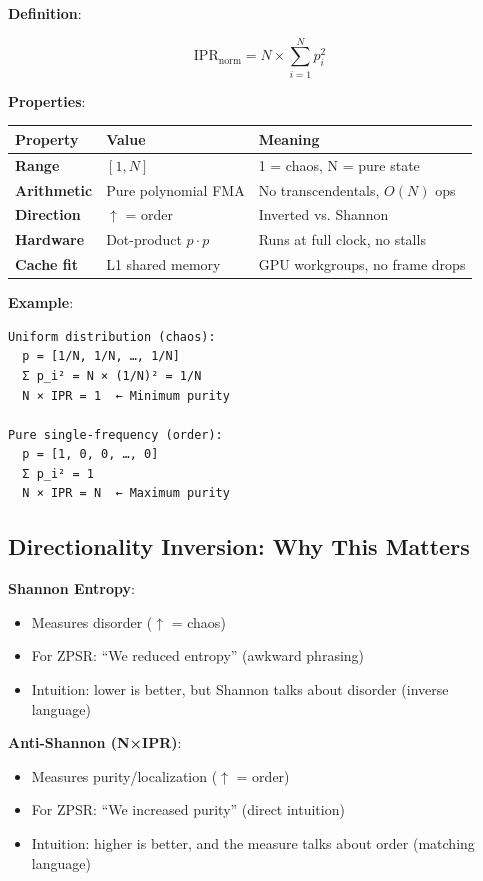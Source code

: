 \documentclass[11pt,oneside]{article}
\begin{document}
\textbf{Definition}:

\[\text{IPR}_{\text{norm}} = N \times \sum_{i=1}^{N} p_i^2\]

\textbf{Properties}:

\begin{center}
\begin{tabular}{lll}
\toprule
Property & Value & Meaning \\
\midrule
\textbf{Range} & $[1, N]$ & 1 = chaos, N = pure state \\
\textbf{Arithmetic} & Pure polynomial FMA & No transcendentals, $O(N)$ ops \\
\textbf{Direction} & $\uparrow$ = order & Inverted vs. Shannon \\
\textbf{Hardware} & Dot-product $p \cdot p$ & Runs at full clock, no stalls \\
\textbf{Cache fit} & L1 shared memory & GPU workgroups, no frame drops \\
\bottomrule
\end{tabular}
\end{center}

\textbf{Example}:

\begin{lstlisting}
Uniform distribution (chaos):
  p = [1/N, 1/N, …, 1/N]
  Σ p_i² = N × (1/N)² = 1/N
  N × IPR = 1  ← Minimum purity

Pure single-frequency (order):
  p = [1, 0, 0, …, 0]
  Σ p_i² = 1
  N × IPR = N  ← Maximum purity
\end{lstlisting}

\subsection{Directionality Inversion: Why This Matters}

\textbf{Shannon Entropy}:
\begin{itemize}
  \item Measures disorder ($\uparrow$ = chaos)
  \item For ZPSR: ``We reduced entropy'' (awkward phrasing)
  \item Intuition: lower is better, but Shannon talks about disorder (inverse language)
\end{itemize}

\textbf{Anti-Shannon (N×IPR)}:
\begin{itemize}
  \item Measures purity/localization ($\uparrow$ = order)
  \item For ZPSR: ``We increased purity'' (direct intuition)
  \item Intuition: higher is better, and the measure talks about order (matching language)
\end{itemize}
\end{document}
